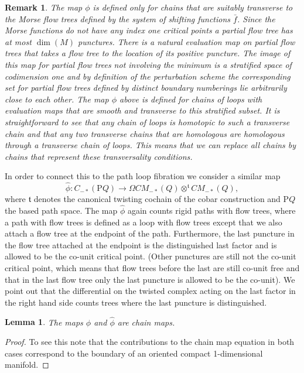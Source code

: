\documentclass{gtpart}
\newtheorem{lem}[thm]{Lemma}
\newtheorem{rem}[thm]{Remark}
\renewcommand{\t}{\mathfrak{t}}
\begin{document}
\begin{rem}
	The map $\phi$ is defined only for chains that are suitably transverse to the Morse flow trees defined by the system of shifting functions $\bar f$. Since the Morse functions do not have any index one critical points a partial flow tree has at most $\dim(M)$ punctures. There is a natural evaluation map on partial flow trees that takes a flow tree to the location of its positive puncture. The image of this map for partial flow trees not involving the minimum is a stratified space of codimension one and by definition of the perturbation scheme the corresponding set for partial flow trees defined by distinct boundary numberings lie arbitrarily close to each other. The map $\phi$ above is defined for chains of loops with evaluation maps that are smooth and transverse to this stratified subset. It is straightforward to see that any chain of loops is homotopic to such a transverse chain and that any two transverse chains that are homologous are homologous through a transverse chain of loops. This means that we can replace all chains by chains that represent these transversality conditions. 
\end{rem}

In order to connect this to the path loop fibration we consider a similar map
\[
    \hat{\phi} \colon C_{-\ast}(\mathrm{P} Q)\to \Omega CM_{-\ast}(Q)\otimes^{\t} CM_{-\ast}(Q),
\]
where $\t$ denotes the canonical twisting cochain of the cobar construction and $\mathrm{P}Q$ the based path
space. The map $\hat{\phi}$ again counts rigid paths with flow trees, where a path with flow trees is defined as a loop with flow trees except that we also attach a flow tree at the endpoint of the path. Furthermore, the last puncture in the flow tree attached at the endpoint is the distinguished last factor and is allowed to be the co-unit critical point. (Other punctures are still not the co-unit critical point, which means that flow trees before the last are still co-unit free and that in the last flow tree only the last puncture is allowed to be the co-unit). We point out that the differential on the twisted complex acting on the last factor in the right hand side counts trees where the last puncture is distinguished.

\begin{lem}
    The maps $\phi$ and $\hat{\phi}$ are chain maps.
\end{lem}

\begin{proof}
	To see this note that the contributions to the chain map equation in both cases correspond to the boundary of an oriented compact 1-dimensional manifold. 
\end{proof}
\end{document}
